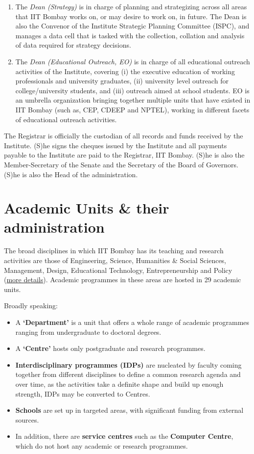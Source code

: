 \documentclass[
  10pt,
  a5paper,
  10pt,
  openany]{amsbook}
\providecommand{\tightlist}{%
  \setlength{\itemsep}{0pt}\setlength{\parskip}{0pt}}
\begin{document}
\begin{enumerate}
\item
  The \emph{Dean (Strategy)} is in charge of planning and strategizing
  across all areas that IIT Bombay works on, or may desire to work on,
  in future. The Dean is also the Convenor of the Institute Strategic
  Planning Committee (ISPC), and manages a data cell that is tasked with
  the collection, collation and analysis of data required for strategy
  decisions.
\item
  The \emph{Dean (Educational Outreach, EO)} is in charge of all
  educational outreach activities of the Institute, covering (i) the
  executive education of working professionals and university graduates,
  (ii) university level outreach for college/university students, and
  (iii) outreach aimed at school students. EO is an umbrella
  organization bringing together multiple units that have existed in IIT
  Bombay (such as, CEP, CDEEP and NPTEL), working in different facets of
  educational outreach activities.
\end{enumerate}

The Registrar is officially the custodian of all records and funds
received by the Institute. (S)he signs the cheques issued by the
Institute and all payments payable to the Institute are paid to the
Registrar, IIT Bombay. (S)he is also the Member-Secretary of the Senate
and the Secretary of the Board of Governors. (S)he is also the Head of
the administration.

\section{Academic Units \& their
administration}\label{academic-units-their-administration}

The broad disciplines in which IIT Bombay has its teaching and research
activities are those of Engineering, Science, Humanities \& Social
Sciences, Management, Design, Educational Technology, Entrepreneurship
and Policy (\href{https://www.iitb.ac.in/divisions}{more details}).
Academic programmes in these areas are hosted in 29 academic units.

Broadly speaking:

\begin{itemize}
\tightlist
\item
  A \textbf{`Department'} is a unit that offers a whole range of
  academic programmes ranging from undergraduate to doctoral degrees.
\item
  A \textbf{`Centre'} hosts only postgraduate and research programmes.
\item
  \textbf{Interdisciplinary programmes (IDPs)} are nucleated by faculty
  coming together from different disciplines to define a common research
  agenda and over time, as the activities take a definite shape and
  build up enough strength, IDPs may be converted to Centres.
\item
  \textbf{Schools} are set up in targeted areas, with significant
  funding from external sources.
\item
  In addition, there are \textbf{service centres} such as the
  \textbf{Computer Centre}, which do not host any academic or research
  programmes.
\end{itemize}
\end{document}

